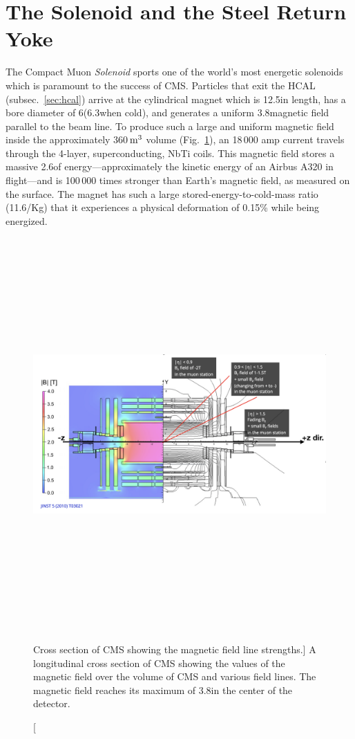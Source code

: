 \section{The Solenoid and the Steel Return Yoke}
\label{sec:solenoid}

The Compact Muon \emph{Solenoid} sports one of the world's most energetic solenoids which is paramount to the success of CMS.
Particles that exit the HCAL (subsec.~\ref{sec:hcal}) arrive at the cylindrical magnet which is 12.5\meter in length, has a bore diameter of 6\meter (6.3\meter when cold), and generates a uniform 3.8\tesla magnetic field parallel to the beam line.
To produce such a large and uniform magnetic field inside the approximately 360$\meter^3$ volume (Fig.~\ref{fig:cms_magnetic_field}), an 18\,000 amp current travels through the 4-layer, superconducting, NbTi coils.
This magnetic field stores a massive 2.6\GJ of energy---approximately the kinetic energy of an Airbus A320 in flight---and is 100\,000 times stronger than Earth's magnetic field, as measured on the surface.
The magnet has such a large stored-energy-to-cold-mass ratio (11.6\KJ/Kg) that it experiences a physical deformation of 0.15\% while being energized.
\begin{figure}[pbth]
    \centering
    \includegraphics[width=15cm,height=15cm,keepaspectratio]{figures/cms/solenoid/CMS_longitudinal_view_magnetic_field.png}
        \caption
            [Cross section of CMS showing the magnetic field line strengths.]
            {
            A longitudinal cross section of CMS showing the values of the magnetic field over the volume of CMS and various field lines. 
            The magnetic field reaches its maximum of 3.8\tesla in the center of the detector.
            }
        \label{fig:cms_magnetic_field}
    \end{figure}

